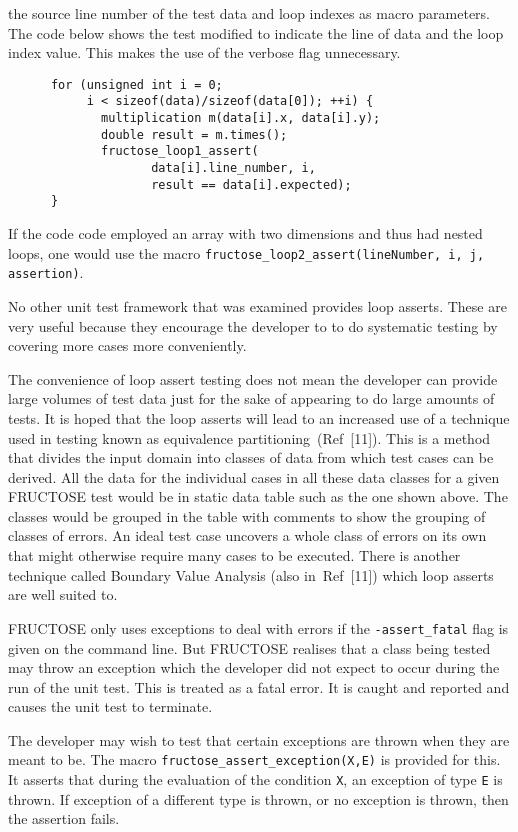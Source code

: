 \documentclass{book}
\begin{document}
the source line number of the test data and loop indexes
as macro parameters. The code below shows the test modified
to indicate the line of data and the loop index value.
This makes the use of the verbose flag unnecessary.
\begin{verbatim}
      for (unsigned int i = 0; 
           i < sizeof(data)/sizeof(data[0]); ++i) {
             multiplication m(data[i].x, data[i].y);
             double result = m.times();
             fructose_loop1_assert(
                    data[i].line_number, i,
                    result == data[i].expected);
      }
\end{verbatim}
If the code code employed an array with two dimensions
and thus had nested loops, one would use the macro
{\tt fructose\_loop2\_assert(lineNumber, i, j, assertion)}.

No other unit test framework that was examined provides loop asserts.
These are very useful because they encourage the developer to 
to do systematic testing by covering more cases more conveniently.

The convenience of loop assert testing does not mean the
developer can provide large volumes of test data just for the
sake of appearing to do large amounts of tests.
It is hoped that the loop asserts will lead to an increased
use of a technique used in testing known as equivalence
partitioning~(Ref~[11]). This is a method that divides the input
domain into classes of data from which test cases can be derived.
All the data for the individual cases in all these data classes
for a given FRUCTOSE test would be in static data table such as
the one shown above. The classes would be grouped in the table
with comments to show the grouping of classes of errors.
An ideal test case uncovers a whole class of errors on its own
that might otherwise require many cases to be executed.
There is another technique called Boundary Value Analysis
(also in~Ref~[11]) which loop asserts are well suited to.


FRUCTOSE only uses exceptions to deal with errors if the
{\tt -assert\_fatal} flag is given on the command line.
But FRUCTOSE realises that a class being tested may throw
an exception which the developer did not expect to occur
during the run of the unit test. This is treated as a
fatal error. It is caught and reported and causes the
unit test to terminate.

The developer may wish to test that certain exceptions are
thrown when they are meant to be. 
The macro {\tt fructose\_assert\_exception(X,E)}
is provided for this. It asserts that during the evaluation
of the condition {\tt X}, an exception of type {\tt E}
is thrown. If exception of a different type is thrown,
or no exception is thrown, then the assertion fails.
\end{document}

